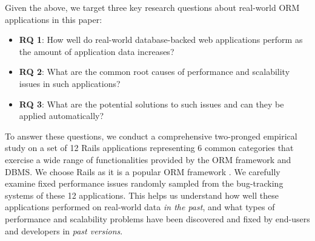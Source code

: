 Given the above, we target three key research questions about real-world ORM applications in this paper:

\begin{itemize}
\item {\bf RQ 1}: How well do real-world database-backed web applications perform as the amount of application data increases?
\item {\bf RQ 2}: What are the common root causes of performance and scalability issues in such applications?
\item {\bf RQ 3}: What are the potential solutions to such issues and can they be applied automatically?
\end{itemize}

To answer these questions, we conduct a comprehensive two-pronged empirical study on a set of 12 Rails applications representing 6 common categories that exercise a wide range of functionalities provided by the ORM framework and DBMS. We choose Rails as it is a popular ORM framework \cite{hotframework}.
%
%
%
%
We carefully examine \numissues fixed performance issues randomly sampled from the bug-tracking systems of these 12 applications. This helps us understand how well these applications performed on real-world data \textit{in the past}, and what types of performance and scalability problems have been discovered and fixed by end-users and developers in \textit{past versions}.

